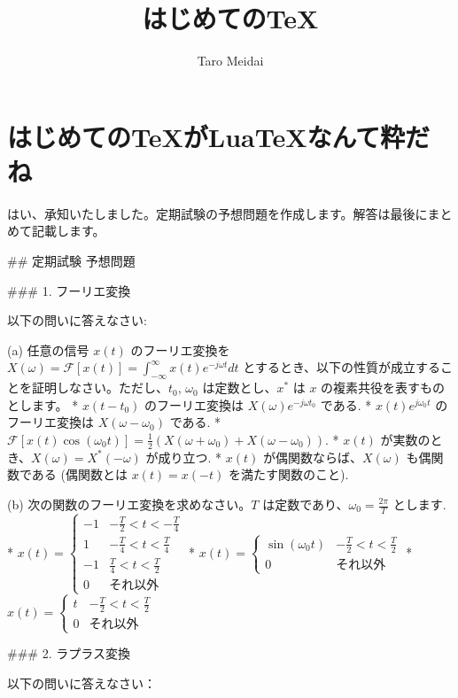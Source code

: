 \documentclass{ltjsarticle}
\begin{document}
\title{はじめての\TeX }
\author{Taro Meidai}
\maketitle
\section{はじめての\TeX がLua\TeX なんて粋だね}
はい、承知いたしました。定期試験の予想問題を作成します。解答は最後にまとめて記載します。

## 定期試験 予想問題

### 1. フーリエ変換

以下の問いに答えなさい:

(a) 任意の信号 $x(t)$ のフーリエ変換を $X(\omega) = \mathcal{F}[x(t)] = \int_{-\infty}^{\infty} x(t)e^{-j\omega t} dt$ とするとき、以下の性質が成立することを証明しなさい。ただし、$t_0$, $\omega_0$ は定数とし、$x^*$ は $x$ の複素共役を表すものとします。
    *   $x(t - t_0)$ のフーリエ変換は $X(\omega)e^{-j\omega t_0}$ である.
    *   $x(t)e^{j\omega_0 t}$ のフーリエ変換は $X(\omega - \omega_0)$ である.
    *   $\mathcal{F}[x(t)\cos(\omega_0 t)] = \frac{1}{2}(X(\omega + \omega_0) + X(\omega - \omega_0))$.
    *   $x(t)$ が実数のとき、$X(\omega) = X^*(-\omega)$ が成り立つ.
    *   $x(t)$ が偶関数ならば、$X(\omega)$ も偶関数である (偶関数とは $x(t) = x(-t)$ を満たす関数のこと).

(b) 次の関数のフーリエ変換を求めなさい。$T$ は定数であり、$\omega_0 = \frac{2\pi}{T}$ とします.
    *   $x(t) = \begin{cases} -1 & -\frac{T}{2} < t < -\frac{T}{4} \\ 1 & -\frac{T}{4} < t < \frac{T}{4} \\ -1 & \frac{T}{4} < t < \frac{T}{2} \\ 0 & \text{それ以外} \end{cases}$
    *   $x(t) = \begin{cases} \sin(\omega_0 t) & -\frac{T}{2} < t < \frac{T}{2} \\ 0 & \text{それ以外} \end{cases}$
    *   $x(t) = \begin{cases} t & -\frac{T}{2} < t < \frac{T}{2} \\ 0 & \text{それ以外} \end{cases}$

### 2. ラプラス変換

以下の問いに答えなさい：
\end{document}

